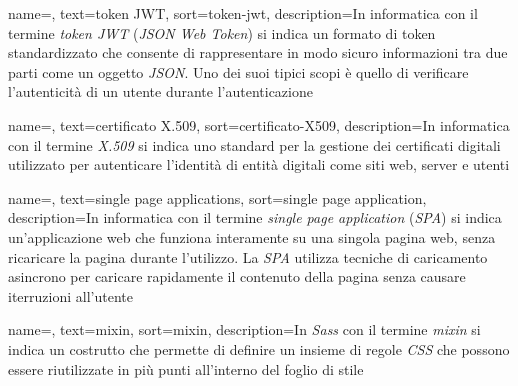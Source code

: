  {
    name=,
    text=token JWT,
    sort=token-jwt,
    description={In informatica con il termine \emph{token JWT} (\emph{JSON Web Token}) si indica un formato di token standardizzato che consente di rappresentare in modo sicuro informazioni tra due parti come un oggetto \emph{JSON}. Uno dei suoi tipici scopi è quello di verificare l'autenticità di un utente durante l'autenticazione} 
}


 {
    name=,
    text=certificato X.509,
    sort=certificato-X509,
    description={In informatica con il termine \emph{X.509} si indica uno standard per la gestione dei certificati digitali utilizzato per autenticare l'identità di entità digitali come siti web, server e utenti}
}


 {
    name=,
    text=single page applications,
    sort=single page application,
    description={In informatica con il termine \emph{single page application} (\emph{SPA}) si indica un'applicazione web che funziona interamente su una singola pagina web, senza ricaricare la pagina durante l'utilizzo. La \emph{SPA} utilizza tecniche di caricamento asincrono per caricare rapidamente il contenuto della pagina senza causare iterruzioni all'utente} 
}


 {
    name=,
    text=mixin,
    sort=mixin,
    description={In \emph{Sass} con il termine \emph{mixin} si indica un costrutto che permette di definire un insieme di regole \emph{CSS} che possono essere riutilizzate in più punti all'interno del foglio di stile}
}